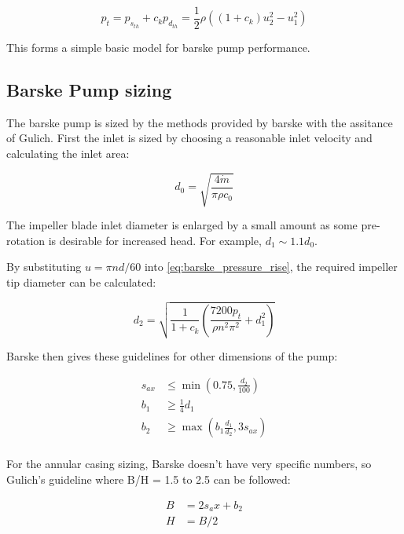 \begin{equation}
    p_t = p_{s_{th}} + c_k p_{d_{th}}=\frac{1}{2}\rho\left((1+c_k) u_2^2 - u_1^2\right)
    \label{eq:barske_pressure_rise}
\end{equation}

This forms a simple basic model for barske pump performance. 

\subsection{Barske Pump sizing}

The barske pump is sized by the methods provided by barske \cite{barske1953} with the assitance of Gulich. First the inlet is sized by choosing a reasonable inlet velocity and calculating the inlet area:

\begin{equation}
    d_0 = \sqrt{\frac{4\dot{m}}{\pi \rho c_0}}
    \label{eq:barske_inlet_diameter}
\end{equation}

The impeller blade inlet diameter is enlarged by a small amount as some pre-rotation is desirable for increased head. For example, $d_1\sim1.1d_0$.

By substituting $u=\pi n d / 60$ into \cref{eq:barske_pressure_rise}, the required impeller tip diameter can be calculated:

\begin{equation}
    d_2 = \sqrt{\frac{1}{1+c_k}\left(\frac{7200p_t}{\rho n^2\pi^2} + d_1^2\right)}
    \label{eq:barske_tip_diameter}
\end{equation}

Barske then gives these guidelines for other dimensions of the pump:

\begin{align}
    s_{ax} & \leq \min{\left(0.75, \frac{d_2}{100}\right)} \\
    b_1 & \geq \frac{1}{4} d_1 \\ %
    b_2 & \geq \max{\left(b_1 \frac{d_1}{d_2}, 3s_{ax}\right)} \\
\end{align}

For the annular casing sizing, Barske doesn't have very specific numbers, so Gulich's guideline where B/H = 1.5 to 2.5 can be followed:

\begin{align}
    B & = 2 s_ax + b_2 \\
    H & = B / 2
\end{align}

